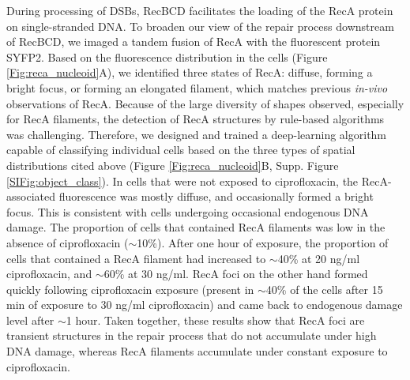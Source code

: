 During processing of DSBs, RecBCD facilitates the loading of the RecA protein on single-stranded DNA. To broaden our view of the repair process downstream of RecBCD, we imaged a tandem fusion of RecA with the fluorescent protein SYFP2\cite{Wiktor2021}. Based on the fluorescence distribution in the cells (Figure \ref{Fig:reca_nucleoid}A), we identified three states of RecA: diffuse, forming a bright focus, or forming an elongated filament, which matches previous \emph{in-vivo} observations of RecA\cite{Wiktor2021}. Because of the large diversity of shapes observed, especially for RecA filaments, the detection of RecA structures by rule-based algorithms was challenging. Therefore, we designed and trained a deep-learning algorithm capable of classifying individual cells based on the three types of spatial distributions cited above (Figure \ref{Fig:reca_nucleoid}B, Supp. Figure \ref{SIFig:object_class}). In cells that were not exposed to ciprofloxacin, the RecA-associated fluorescence was mostly diffuse, and occasionally formed a bright focus. This is consistent with cells undergoing occasional endogenous DNA damage. The proportion of cells that contained RecA filaments was low in the absence of ciprofloxacin ($\sim$10\%). After one hour of exposure, the proportion of cells that contained a RecA filament had increased to $\sim$40\% at 20 ng/ml ciprofloxacin, and $\sim$60\% at 30 ng/ml. RecA foci on the other hand formed quickly following ciprofloxacin exposure (present in $\sim$40\% of the cells after 15 min of exposure to 30 ng/ml ciprofloxacin) and came back to endogenous damage level after $\sim$1 hour. Taken together, these results show that RecA foci are transient structures in the repair process that do not accumulate under high DNA damage, whereas RecA filaments accumulate under constant exposure to ciprofloxacin.

